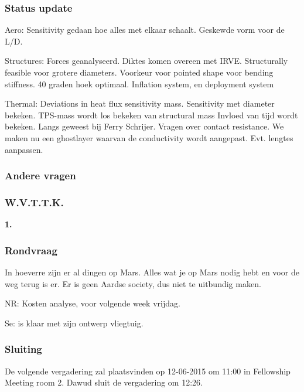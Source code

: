 \subsubsection{Status update}
Aero: Sensitivity gedaan hoe alles met elkaar schaalt. Geskewde vorm voor de L/D.

Structures: Forces geanalyseerd. Diktes komen overeen met IRVE. Structurally feasible voor grotere diameters. Voorkeur voor pointed shape voor bending stiffness. 40 graden hoek optimaal. Inflation system, en deployment system

Thermal: Deviations in heat flux sensitivity mass. Sensitivity met diameter bekeken. TPS-mass wordt los bekeken van structural mass Invloed van tijd wordt bekeken. Langs geweest bij Ferry Schrijer. Vragen over contact resistance. We maken nu een ghostlayer waarvan de conductivity wordt aangepast. Evt. lengtes aanpassen.


\subsubsection{Andere vragen}

\subsubsection{W.V.T.T.K.}

\textbf{1.}

\subsubsection{Rondvraag}
In hoeverre zijn er al dingen op Mars. Alles wat je op Mars nodig hebt en voor de weg terug is er. Er is geen Aardse society, dus niet te uitbundig maken.

NR: Kosten analyse, voor volgende week vrijdag.

Se: is klaar met zijn ontwerp vliegtuig.
\subsubsection{Sluiting}
De volgende vergadering zal plaatsvinden op 12-06-2015 om 11:00 in Fellowship Meeting room 2.
\newline\newline
Dawud sluit de vergadering om 12:26.